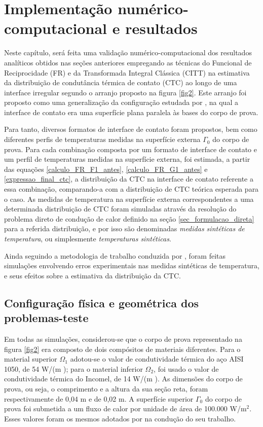 \section{Implementação numérico-computacional e resultados}

Neste capítulo, será feita uma validação numérico-computacional dos resultados analíticos obtidos nas seções anteriores empregando as técnicas do Funcional de Reciprocidade (FR) e da Transformada Integral Clássica (CITT) na estimativa da distribuição de condutância térmica de contato (CTC) ao longo de uma interface irregular segundo o arranjo proposto na figura \ref{fig2}. Este arranjo foi proposto como uma generalização da configuração estudada por \cite{tese_padilha}, na qual a interface de contato era uma superfície plana paralela às bases do corpo de prova.

Para tanto, diversos formatos de interface de contato foram propostos, bem como diferentes perfis de temperaturas medidas na superfície externa $\Gamma_0$ do corpo de prova. Para cada combinação composta por um formato de interface de contato e um perfil de temperaturas medidas na superfície externa, foi estimada, a partir das equações \eqref{calculo_FR_F1_antes}, \eqref{calculo_FR_G1_antes} e \eqref{expressao_final_ctc}, a distribuição da CTC na interface de contato referente a essa combinação, comparando-a com a distribuição de CTC teórica esperada para o caso. As medidas de temperatura na superfície externa correspondentes a uma determinada distribuição de CTC foram simuladas através da resolução do problema direto de condução de calor definido na seção \ref{sec_formulacao_direta} para a referida distribuição, e por isso são denominadas \textit{medidas sintéticas de temperatura}, ou simplesmente \textit{temperaturas sintéticas}.

Ainda seguindo a metodologia de trabalho conduzida por \cite{tese_padilha}, foram feitas simulações envolvendo erros experimentais nas medidas sintéticas de temperatura, e seus efeitos sobre a estimativa da distribuição da CTC.

\subsection{Configuração física e geométrica dos problemas-teste}\label{config_fis_geom}

Em todas as simulações, considerou-se que o corpo de prova representado na figura \ref{fig2} era composto de dois compósitos de materiais diferentes. Para o material superior $\Omega_1$ adotou-se o valor de condutividade térmica do aço AISI 1050, de 54 W/(m \celsius); para o material inferior $\Omega_2$, foi usado o valor de condutividade térmica do Incomel, de 14 W/(m \celsius). As dimensões do corpo de prova, ou seja, o comprimento e a altura da sua seção reta, foram respectivamente de 0,04 m e de 0,02 m. A superfície superior $\Gamma_0$ do corpo de prova foi submetida a um fluxo de calor por unidade de área de 100.000 W/$\text{m}^2$. Esses valores foram os mesmos adotados por \cite{tese_padilha} na condução do seu trabalho.

